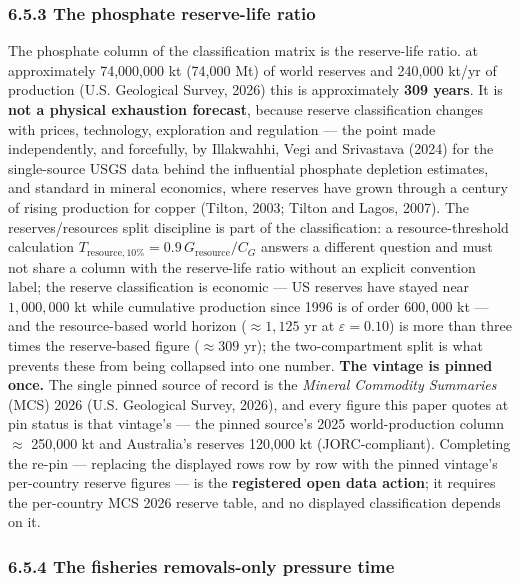 \documentclass[11pt]{article}
\begin{document}
\subsubsection*{6.5.3 The phosphate reserve-life ratio}\label{653-the-phosphate-reserve-life-ratio}

The phosphate column of the classification matrix is the reserve-life ratio. at approximately 74,000,000 kt (74,000 Mt) of world reserves and 240,000 kt/\allowbreak{}yr of production (U.S. Geological Survey, 2026) this is approximately \textbf{309 years}. It is \textbf{not a physical exhaustion forecast}, because reserve classification changes with prices, technology, exploration and regulation --- the point made independently, and forcefully, by Illakwahhi, Vegi and Srivastava (2024) for the single-source USGS data behind the influential phosphate depletion estimates, and standard in mineral economics, where reserves have grown through a century of rising production for copper (Tilton, 2003; Tilton and Lagos, 2007). The reserves/\allowbreak{}resources split discipline is part of the classification: a resource-threshold calculation \(T_{\mathrm{resource},\allowbreak{}10\%} =\allowbreak{} 0.9\,\allowbreak{} G_{\mathrm{resource}}/C_G\) answers a different question and must not share a column with the reserve-life ratio without an explicit convention label; the reserve classification is economic --- US reserves have stayed near \(1{,}000{,}000\) kt while cumulative production since 1996 is of order \(600{,}000\) kt --- and the resource-based world horizon (\(\approx 1{,}125\) yr at \(\varepsilon = 0.10\)) is more than three times the reserve-based figure (\(\approx 309\) yr); the two-compartment split is what prevents these from being collapsed into one number. \textbf{The vintage is pinned once.} The single pinned source of record is the \emph{Mineral Commodity Summaries} (MCS) 2026 (U.S. Geological Survey, 2026), and every figure this paper quotes at pin status is that vintage's --- the pinned source's 2025 world-production column \ensuremath{\approx} 250,000 kt and Australia's reserves 120,000 kt (JORC-compliant). Completing the re-pin --- replacing the displayed rows row by row with the pinned vintage's per-country reserve figures --- is the \textbf{registered open data action}; it requires the per-country MCS 2026 reserve table, and no displayed classification depends on it.

\subsubsection*{6.5.4 The fisheries removals-only pressure time}\label{654-the-fisheries-removals-only-pressure-time}
\end{document}
